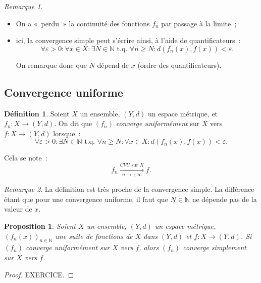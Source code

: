 \documentclass{report}
\newtheorem{prp}[thm]{Proposition}
\theoremstyle{definition}
\newtheorem{déf}[thm]{Définition}
\theoremstyle{remark}
\newtheorem*{rmq}{Remarque}
\numberwithin{equation}{section}
\newcommand{\N}{\mathbb N}
\newcommand{\tq}{\text{ t.q. }}
\newcommand{\seqf}[4]{\left(#1_{#2}\left(#3\right)\right)_{#2 \in #4}}
\newcommand{\CONV}[5]{\xrightarrow[#2 \to #3]{#4 \text{ #5 } #1}}
\newcommand{\CVU}[3]{\CONV{#1}{#2}{#3}{CVU}{sur}}
\newcommand{\pinfty}{{+\infty}}
\begin{document}
			\begin{rmq}~
			\begin{itemize}
				\item On a «~perdu~» la continuité des fonctions $f_n$ par passage à la limite~;
				\item ici, la convergence simple peut s'écrire ainsi, à l'aide de quantificateurs~:
					\begin{equation}
						\forall \varepsilon > 0 : \forall x \in X : \exists N \in \N \tq \forall n \geq N : d(f_n(x), f(x)) < \varepsilon.
					\end{equation}

					On remarque donc que $N$ dépend de $x$ (ordre des quantificateurs).
			\end{itemize}
			\end{rmq}

		\subsection{Convergence uniforme}
			\begin{déf} Soient $X$ un ensemble, $(Y, d)$ un espace métrique, et $f_n : X \to (Y, d)$. On dit que $(f_n)$ \textit{converge uniformément} sur $X$
			vers $f : X \to (Y, d)$ lorsque~:
			\begin{equation}
				\forall \varepsilon > 0 : \exists N \in \N \tq \forall n \geq N : \forall x \in X : d(f_n(x), f(x)) < \varepsilon.
			\end{equation}

			Cela se note~:
			\begin{equation}
				f_n \CVU Xn\pinfty f.
			\end{equation}
			\end{déf}

			\begin{rmq} La définition est très proche de la convergence simple. La différence étant que pour une convergence uniforme, il faut que
			$N \in \N$ ne dépende pas de la valeur de $x$. \end{rmq}

			\begin{prp} Soient $X$ un ensemble, $(Y, d)$ un espace métrique, $\seqf fnx\N$ une suite de fonctions de $X$ dans $(Y, d)$ et $f : X \to (Y, d)$.
			Si $(f_n)$ converge uniformément sur $X$ vers $f$, alors $(f_n)$ converge simplement sur $X$ vers $f$. \end{prp}

			\begin{proof} EXERCICE.
			\end{proof}
\end{document}
